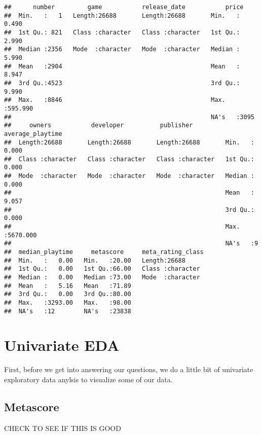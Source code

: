 \documentclass[
]{article}
\begin{document}
\begin{verbatim}
##      number         game           release_date           price        
##  Min.   :   1   Length:26688       Length:26688       Min.   :  0.490  
##  1st Qu.: 821   Class :character   Class :character   1st Qu.:  2.990  
##  Median :2356   Mode  :character   Mode  :character   Median :  5.990  
##  Mean   :2904                                         Mean   :  8.947  
##  3rd Qu.:4523                                         3rd Qu.:  9.990  
##  Max.   :8846                                         Max.   :595.990  
##                                                       NA's   :3095     
##     owners           developer          publisher         average_playtime  
##  Length:26688       Length:26688       Length:26688       Min.   :   0.000  
##  Class :character   Class :character   Class :character   1st Qu.:   0.000  
##  Mode  :character   Mode  :character   Mode  :character   Median :   0.000  
##                                                           Mean   :   9.057  
##                                                           3rd Qu.:   0.000  
##                                                           Max.   :5670.000  
##                                                           NA's   :9         
##  median_playtime     metascore     meta_rating_class 
##  Min.   :   0.00   Min.   :20.00   Length:26688      
##  1st Qu.:   0.00   1st Qu.:66.00   Class :character  
##  Median :   0.00   Median :73.00   Mode  :character  
##  Mean   :   5.16   Mean   :71.89                     
##  3rd Qu.:   0.00   3rd Qu.:80.00                     
##  Max.   :3293.00   Max.   :98.00                     
##  NA's   :12        NA's   :23838
\end{verbatim}

\hypertarget{univariate-eda}{%
\section{Univariate EDA}\label{univariate-eda}}

First, before we get into answering our questions, we do a little bit of
univariate exploratory data anylsis to visualize some of our data.

\hypertarget{metascore}{%
\subsection{Metascore}\label{metascore}}

CHECK TO SEE IF THIS IS GOOD
\end{document}
